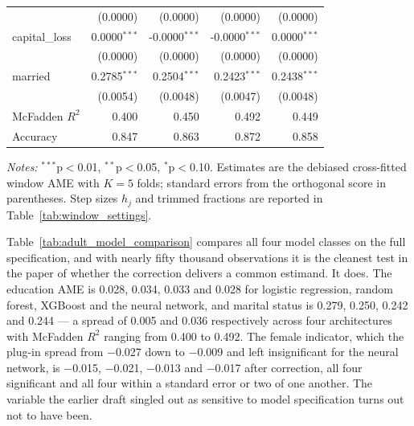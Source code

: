 \documentclass[12pt,a4paper]{article}
\numberwithin{equation}{section}
\theoremstyle{plain}
\theoremstyle{definition}
\begin{document}
\begin{table}[htbp]
\begin{threeparttable}
\begin{tabular}{lrrrr}
				& (0.0000) & (0.0000) & (0.0000) & (0.0000) \\
				capital\_loss & 0.0000$^{***}$ & -0.0000$^{***}$ & -0.0000$^{***}$ & 0.0000$^{***}$ \\
				& (0.0000) & (0.0000) & (0.0000) & (0.0000) \\
				married & 0.2785$^{***}$ & 0.2504$^{***}$ & 0.2423$^{***}$ & 0.2438$^{***}$ \\
				& (0.0054) & (0.0048) & (0.0047) & (0.0048) \\
				\midrule
				McFadden $R^2$ & 0.400 & 0.450 & 0.492 & 0.449 \\
				Accuracy & 0.847 & 0.863 & 0.872 & 0.858 \\
				\bottomrule
				\end{tabular}
				\begin{tablenotes}
				\footnotesize
				\item \textit{Notes:} $^{***}$p$<$0.01, $^{**}$p$<$0.05, $^{*}$p$<$0.10. Estimates are the debiased cross-fitted window AME with $K=5$ folds; standard errors from the orthogonal score in parentheses. Step sizes $h_j$ and trimmed fractions are reported in Table~\ref{tab:window_settings}.
				\end{tablenotes}
		\end{threeparttable}
	\end{table}
	
	Table~\ref{tab:adult_model_comparison} compares all four model classes on the full specification, and with nearly fifty thousand observations it is the cleanest test in the paper of whether the correction delivers a common estimand. It does. The education AME is 0.028, 0.034, 0.033 and 0.028 for logistic regression, random forest, XGBoost and the neural network, and marital status is 0.279, 0.250, 0.242 and 0.244 --- a spread of 0.005 and 0.036 respectively across four architectures with McFadden $R^2$ ranging from 0.400 to 0.492. The female indicator, which the plug-in spread from $-$0.027 down to $-$0.009 and left insignificant for the neural network, is $-$0.015, $-$0.021, $-$0.013 and $-$0.017 after correction, all four significant and all four within a standard error or two of one another. The variable the earlier draft singled out as sensitive to model specification turns out not to have been.
\end{document}
